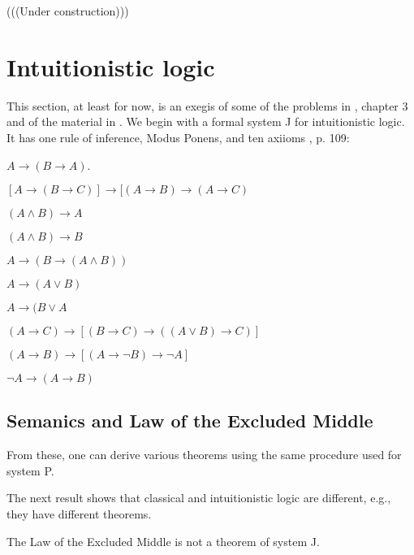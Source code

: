 


\begin{mathmacro}
\newcommand{\set}[1]{\{ #1 \}}
\newcommand{\opensets}[0]{\mathcal{O}}
\newcommand{\for}[0]{\mathcal{F}}
\newcommand{\axioms}[0]{\mathcal{A}}
\newcommand{\theorems}[0]{\mathcal{T}}
\end{mathmacro}

(((Under construction)))


\section{Intuitionistic logic}

\innertableofcontents

This section, at least for now, is an exegis of some of the problems in \cite{RH}, chapter 3 and of the material in \cite{WKIL}.  We begin with a formal system J for intuitionistic logic. It has one rule of inference, Modus Ponens, and ten axiioms \cite{RH}, p. 109:

 $A \to (B \to A)$.

 $[A \to (B \to C)] \to [(A \to B) \to (A \to C) $

 $(A \land B) \to A$

 $(A \land B) \to B$

 $A \to (B \to (A \land B)) $

 $A \to (A \lor B)$

 $A \to (B \lor A$

 $(A \to C) \to [(B \to C) \to ((A \lor B) \to C)] $

 $(A \to B) \to [(A \to \neg B) \to \neg A ] $

 $\neg A \to (A \to B) $

\subsection{Semanics and Law of the Excluded Middle}

From these, one can derive various theorems using the same procedure used for system P.

The next result shows that classical  and intuitionistic logic are different, e.g., they have different theorems.

\begin{theorem}  \label{lem} The Law of the Excluded Middle is not a theorem of system J.
\end{theorem}


